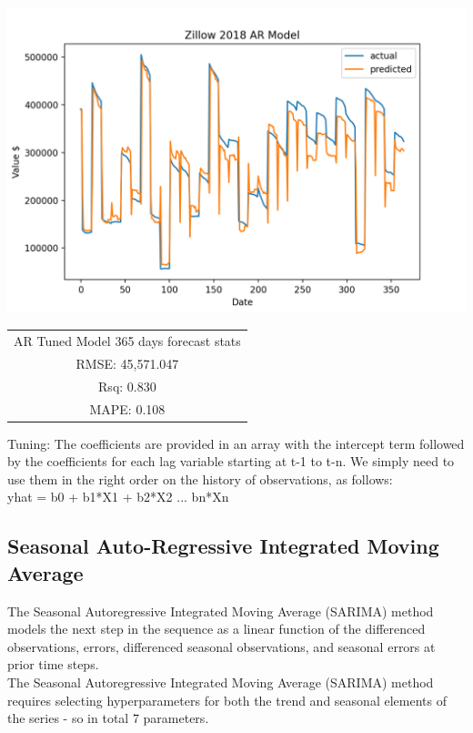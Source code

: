 \documentclass{article}
\begin{document}
	\includegraphics[scale = 0.5]{../plots/2018/zillow2018_AR-model.png}
	\begin{center}
    \begin{tabular}{ c }
     AR Tuned Model 365 days forecast stats \\ 
     RMSE: 45,571.047 \\  
     Rsq: 0.830 \\
     MAPE: 0.108 \\
    \end{tabular}
    \end{center}

    Tuning: The coefficients are provided in an array with the intercept term followed by the coefficients for each lag variable starting at t-1 to t-n. We simply need to use them in the right order on the history of observations, as follows: \\ yhat = b0 + b1*X1 + b2*X2 ... bn*Xn 

	\subsection{Seasonal Auto-Regressive Integrated Moving Average}
	The Seasonal Autoregressive Integrated Moving Average (SARIMA) method models the next step in the sequence as a linear function of the differenced observations, errors, differenced seasonal observations, and seasonal errors at prior time steps. \\
	
	The Seasonal Autoregressive Integrated Moving Average (SARIMA) method requires selecting hyperparameters for both the trend and seasonal elements of the series - so in total 7 parameters.\\
	
\end{document}
